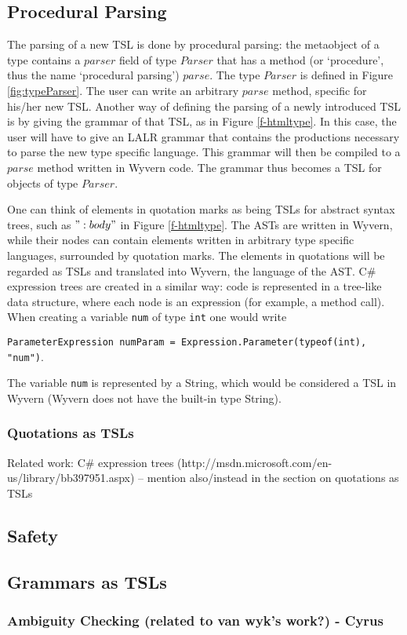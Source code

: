 \subsection{Procedural Parsing}

The parsing of a new TSL is done by procedural parsing: the metaobject of a type contains a $parser$ field of type $Parser$ that has a method (or `procedure', thus the name `procedural parsing') $parse$. The type $Parser$ is defined in Figure \ref{fig:typeParser}. The user can write an arbitrary $parse$ method, specific for his/her new TSL. Another way of defining the parsing of a newly introduced TSL is by giving the grammar of that TSL, as in Figure \ref{f-htmltype}. In this case, the user will have to give an LALR grammar that contains the productions necessary to parse the new type specific language. This grammar will then be compiled to a $parse$ method written in Wyvern code. The grammar thus becomes a TSL for objects of type $Parser$. 

One can think of elements in quotation marks as being TSLs for abstract syntax trees, such as $":body"$ in Figure \ref{f-htmltype}. The ASTs are written in Wyvern, while their nodes can contain elements written in arbitrary type specific languages, surrounded by quotation marks. The elements in quotations will be regarded as TSLs and translated into Wyvern, the language of the AST. C\# expression trees \cite{Csharp} are created in a similar way: code is represented in a tree-like data structure, where each node is an expression (for example, a method call). When creating a variable \lstinline{num} of type \lstinline{int} one would write

 \lstinline{ParameterExpression numParam = Expression.Parameter(typeof(int), "num")}.

 The variable \lstinline{num} is represented by a String, which would be considered a TSL in Wyvern (Wyvern does not have the built-in type String).

\subsubsection{Quotations as TSLs}
Related work: C\# expression trees (http://msdn.microsoft.com/en-us/library/bb397951.aspx) -- mention also/instead in the section on quotations as TSLs

\subsection{Safety}
\subsection{Grammars as TSLs}
\subsubsection{Ambiguity Checking (related to van wyk's work?) - Cyrus}
